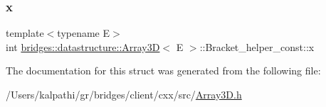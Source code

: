 \subsubsection{\texorpdfstring{x}{x}}
{\footnotesize\ttfamily template$<$typename E$>$ \\
int \mbox{\hyperlink{classbridges_1_1datastructure_1_1_array3_d}{bridges\+::datastructure\+::\+Array3D}}$<$ E $>$\+::Bracket\+\_\+helper\+\_\+const\+::x}



The documentation for this struct was generated from the following file\+:\begin{DoxyCompactItemize}
\item 
/\+Users/kalpathi/gr/bridges/client/cxx/src/\mbox{\hyperlink{_array3_d_8h}{Array3\+D.\+h}}\end{DoxyCompactItemize}

